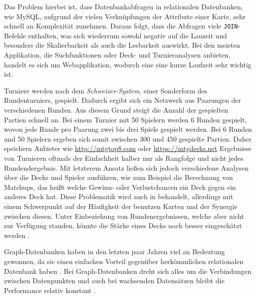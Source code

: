 Das Problem hierbei ist, dass Datenbankabfragen in relationalen Datenbanken, wie MySQL, aufgrund der vielen Verknüpfungen der Attribute einer Karte, sehr schnell an Komplexität zunehmen. Daraus folgt, dass die Abfragen viele \verb|JOIN|-Befehle enthalten, was sich wiederrum sowohl negativ auf die Lauzeit und besonders die Skalierbarkeit als auch die Lesbarkeit auswirkt. Bei den meisten Applikation, die Suchfunktionen oder Deck- und Turnieranalysen anbieten, handelt es sich um Webapplikation, wodurch eine eine kurze Laufzeit sehr wichtig ist.

Turniere werden nach dem \emph{Schweizer-System}, einer Sonderform des Rundenturniers, gespielt. Dadurch ergibt sich ein Netzwerk aus Paarungen der verschiedenen Runden. Aus diesem Grund steigt die Anzahl der gespielten Partien schnell an. Bei einem Turnier mit 50 Spielern werden 6 Runden gespielt, wovon jede Runde pro Paarung zwei bis drei Spiele gespielt werden. Bei 6 Runden und 50 Spielern ergeben sich somit zwischen 300 und 450 gespielte Partien. Daher speichern Anbieter wie \url{http://mtgtop8.com} oder \url{https://mtgdecks.net} Ergebnisse von Turnieren oftmals der Einfachheit halber nur als Rangfolge und nicht jedes Rundendergebnis. Mit letzterem Ansatz ließen sich jedoch verschiedene Analysen über die Decks und Spieler ausführen, wie zum Beispiel die Berechnung von Matchups, das heißt welche Gewinn- oder Verlustchancen ein Deck gegen ein anderes Deck hat. Diese Problematik wird auch in \cite{haumagic} behandelt, allerdings mit einem Schwerpunkt auf der Häufigkeit der benutzen Karten und der Synergie zwischen diesen. Unter Einbeziehung von Rundenergebnissen, welche aber nicht zur Verfügung standen, könnte die Stärke eines Decks noch besser eingeschätzt werden \cite{haumagic}.

Graph-Datenbanken haben in den letzten paar Jahren viel an Bedeutung gewonnen, da sie einen einfachen Vorteil gegenüber herkömmlichen relationalen Datenbank haben \cite{forbes:trend.graphdb}. Bei Graph-Datenbanken dreht sich alles um die Verbindungen zwischen Datenpunkten und auch bei wachsenden Datensätzen bleibt die Performance relativ konstant \cite{robinsongraph:2015}. 

